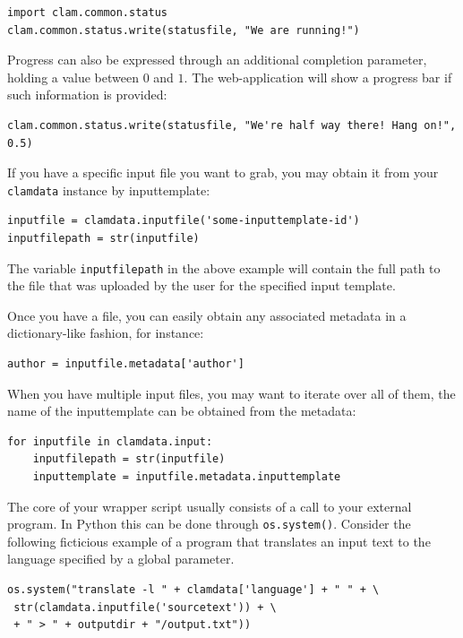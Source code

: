 \documentclass[a4paper,12pt]{report}
\begin{document}
\begin{verbatim}
import clam.common.status
clam.common.status.write(statusfile, "We are running!")
\end{verbatim}

Progress can also be expressed through an additional completion parameter,
holding a value between $0$ and $1$. The web-application will show a progress bar if
such information is provided:

\begin{verbatim}
clam.common.status.write(statusfile, "We're half way there! Hang on!", 0.5)
\end{verbatim}

If you have a specific input file you want to grab, you may obtain it from your
\texttt{clamdata} instance by inputtemplate:

\begin{verbatim}
inputfile = clamdata.inputfile('some-inputtemplate-id')
inputfilepath = str(inputfile) 
\end{verbatim}

The variable \texttt{inputfilepath} in the above example will contain the full
path to the file that was uploaded by the user for the specified input
template. 

Once you have a file, you can easily obtain any associated metadata in a
dictionary-like fashion, for instance:

\begin{verbatim}
author = inputfile.metadata['author']
\end{verbatim}

When you have multiple input files, you may want to iterate over all of them,
the name of the inputtemplate can be obtained from the metadata:

\begin{verbatim}
for inputfile in clamdata.input:
    inputfilepath = str(inputfile)
    inputtemplate = inputfile.metadata.inputtemplate
\end{verbatim}
  
The core of your wrapper script usually consists of a call to your external
program. In Python this can be done through \texttt{os.system()}. Consider the
following ficticious example of a program that translates an input text to the
language specified by a global parameter.

\begin{verbatim}
os.system("translate -l " + clamdata['language'] + " " + \
 str(clamdata.inputfile('sourcetext')) + \
 + " > " + outputdir + "/output.txt"))
\end{verbatim}
\end{document}
